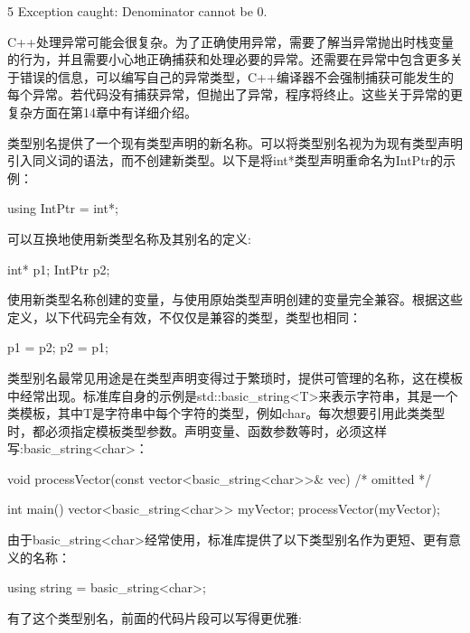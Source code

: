 \begin{shell}
5
Exception caught: Denominator cannot be 0.
\end{shell}

C++处理异常可能会很复杂。为了正确使用异常，需要了解当异常抛出时栈变量的行为，并且需要小心地正确捕获和处理必要的异常。还需要在异常中包含更多关于错误的信息，可以编写自己的异常类型，C++编译器不会强制捕获可能发生的每个异常。若代码没有捕获异常，但抛出了异常，程序将终止。这些关于异常的更复杂方面在第14章中有详细介绍。


类型别名提供了一个现有类型声明的新名称。可以将类型别名视为为现有类型声明引入同义词的语法，而不创建新类型。以下是将int*类型声明重命名为IntPtr的示例：

\begin{cpp}
using IntPtr = int*;
\end{cpp}

可以互换地使用新类型名称及其别名的定义:

\begin{cpp}
int* p1;
IntPtr p2;
\end{cpp}

使用新类型名称创建的变量，与使用原始类型声明创建的变量完全兼容。根据这些定义，以下代码完全有效，不仅仅是兼容的类型，类型也相同：

\begin{cpp}
p1 = p2;
p2 = p1;
\end{cpp}

类型别名最常见用途是在类型声明变得过于繁琐时，提供可管理的名称，这在模板中经常出现。标准库自身的示例是std::basic\_string<T>来表示字符串，其是一个类模板，其中T是字符串中每个字符的类型，例如char。每次想要引用此类类型时，都必须指定模板类型参数。声明变量、函数参数等时，必须这样写:basic\_string<char>：

\begin{cpp}
void processVector(const vector<basic_string<char>>& vec) { /* omitted */ }

int main()
{
    vector<basic_string<char>> myVector;
    processVector(myVector);
}
\end{cpp}

由于basic\_string<char>经常使用，标准库提供了以下类型别名作为更短、更有意义的名称：

\begin{cpp}
using string = basic_string<char>;
\end{cpp}

有了这个类型别名，前面的代码片段可以写得更优雅:

